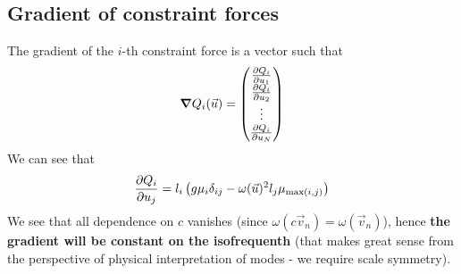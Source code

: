 \documentclass[12pt]{article}
\begin{document}
	\subsection{Gradient of constraint forces}
	The gradient of the $i$-th constraint force is a vector such that
	$$\grad Q_i(\vec{u})=\mqty(\pdv{Q_i}{u_1} \\ \pdv{Q_i}{u_2} \\ \vdots \\ \pdv{Q_i}{u_N})$$
	We can see that
	$$\pdv{Q_i}{u_j}= l_i\left( g\mu_i\delta_{ij} - \omega(\vec{u})^2  l_j \mu_{\max(i,j)} \right)$$
	We see that all dependence on $c$ vanishes (since $\omega(c\vec{v}_n)=\omega(\vec{v}_n)$), hence \textbf{the gradient will be constant on the isofrequenth} (that makes great sense from the perspective of physical interpretation of modes - we require scale symmetry).
	
\end{document}
